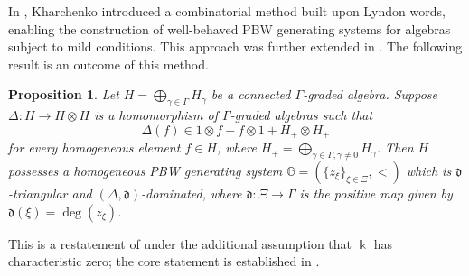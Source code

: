 \documentclass{article}
\makeatletter
\renewenvironment{proof}[1][\proofname]{\par
	\pushQED{\qed}%
	\normalfont \topsep6\p@\@plus6\p@\relax
	\trivlist
	\item[\hskip\labelsep
	\bfseries
	#1\@addpunct{.}]\ignorespaces
}{%
	\popQED\endtrivlist\@endpefalse
}
\theoremstyle{plain}
\newtheorem{prop}[thm]{Proposition}
\theoremstyle{definition}
\numberwithin{equation}{section}
\newcommand{\GG}{\mathbb{G}}
\newcommand{\dd}{\mathfrak{d}}
\makeatother
\begin{document}
	In \cite{Kh99}, Kharchenko introduced a combinatorial method built upon Lyndon words, enabling the construction of well-behaved PBW generating systems for algebras subject to mild conditions. This approach was further extended in \cite{ZSL20, Zh24, LZ25}. The following result is an outcome of this method. 
	
	\begin{prop}\label{Graded-imply-PBW}
		Let $H=\bigoplus_{\gamma\in\Gamma} H_{\gamma}$ be a connected $\Gamma$-graded algebra. Suppose $\Delta\colon H\to H\otimes H$ is a homomorphism of $\Gamma$-graded algebras such that
		\[
		\Delta(f)\in 1\otimes f+f\otimes 1+ H_{+} \otimes H_{+}
		\]
		for every homogeneous element $f\in H$, where $H_{+}= \bigoplus_{\gamma\in \Gamma,\gamma\neq 0} H_{\gamma}$. Then $H$ possesses a homogeneous PBW generating system $\GG=(\{z_\xi\}_{\xi \in\Xi},<)$ which is $\dd$-triangular and $(\Delta,\dd)$-dominated, where $\dd\colon \Xi\to \Gamma$ is the positive map given by $\dd(\xi) =\deg(z_{\xi})$.
	\end{prop}
	
	\begin{proof}
		This is a restatement of \cite[Proposition 5.5]{LZ25} under the additional assumption that $\Bbbk$ has characteristic zero; the core statement is established in \cite[Theorem A]{ZSL20}.
	\end{proof}
	
\end{document}
